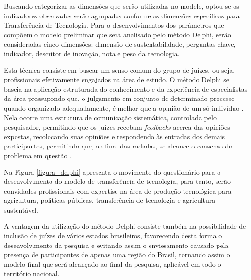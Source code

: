 Buscando categorizar as dimensões que serão utilizadas no modelo, optou-se os indicadores observados serão agrupados conforme as dimensões específicas para Transferência de Tecnologia. Para o desenvolvimentos dos parâmetros que compõem o modelo preliminar que será analisado pelo método Delphi, serão consideradas cinco dimensões: dimensão de sustentabilidade, perguntas-chave, indicador, descritor de inovação, nota e peso da tecnologia.

Esta técnica consiste em buscar um senso comum do grupo de juízes, ou seja, profissionais efetivamente engajados na área de estudo. O método Delphi se baseia na aplicação estruturada do conhecimento e da experiência de especialistas da área pressupondo que, o julgamento em conjunto de determinado processo quando organizado adequadamente, é melhor que a opinião de um só indivíduo \cite{faro_tecnica_1997,santiago_matriz_2012}. Nela  ocorre uma estrutura de comunicação sistemática, controlada pelo pesquisador, permitindo que os juízes recebam \textit{feedbacks} acerca das opiniões expostas, recolocando suas opiniões e respondendo às entradas dos demais participantes, permitindo que, ao final das rodadas, se alcance o consenso do problema em questão \cite{massaroli_metodo_2017}. 

Na Figura \ref{figura_delphi} apresenta o movimento do questionário para o desenvolvimento do modelo de transferência de tecnologia, para tanto, serão convidados profissionais com expertise na área de produção tecnológica para agricultura, políticas públicas, transferência de tecnologia e agricultura sustentável. 

A vantagem da utilização do método Delphi consiste também na possibilidade de inclusão de juízes de vários estados brasileiros, favorecendo desta forma o desenvolvimento da pesquisa e evitando assim o enviesamento causado pela presença de participantes de apenas uma região do Brasil, tornando assim o modelo final que será alcançado ao final da pesquisa, aplicável em todo o território nacional.



